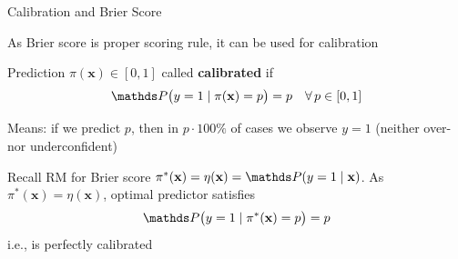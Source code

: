 \documentclass[11pt,compress,t,notes=noshow, xcolor=table]{beamer}
\begin{document}
\begin{vbframe}{Calibration and Brier Score}

\begin{itemizeL}
    \item As Brier score is proper scoring rule, it can be used for calibration
    \item Prediction $\pi(\mathbf{x})\in[0,1]$ called \textbf{calibrated} if 
$$\P\bigl(y=1 \mid \pi(\mathbf{x})=p\bigr)=p \quad \forall\, p\in[0,1]$$
    \item Means: if we predict $p$, then in $p \cdot 100\%$ of cases we observe $y=1$ (neither over- nor underconfident)
    \item Recall RM for Brier score $\pi^*(\mathbf{x}) = \eta(\mathbf{x}) = \P(y=1 \mid \mathbf{x})$. As \(\pi^*(\mathbf{x})=\eta(\mathbf{x})\), optimal predictor satisfies $$\P\bigl(y=1 \mid \pi^*(\mathbf{x})=p\bigr)=p$$
i.e., is perfectly calibrated
\end{itemizeL}

\end{vbframe}
\end{document}
